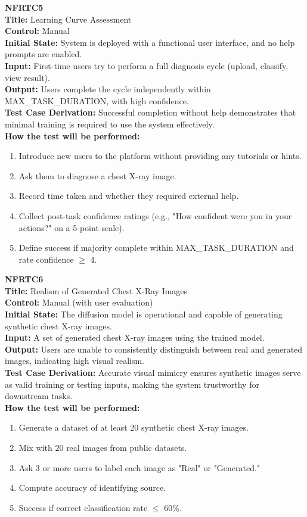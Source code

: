 \documentclass[12pt, titlepage]{article}
\begin{document}
\textbf{NFRTC5}\\
\textbf{Title:} Learning Curve Assessment\\
\textbf{Control:} Manual\\
\textbf{Initial State:} System is deployed with a functional user interface, and no help prompts are enabled.\\
\textbf{Input:} First-time users try to perform a full diagnosis cycle (upload, classify, view result).\\
\textbf{Output:} Users complete the cycle independently within MAX\_TASK\_DURATION, with high confidence.\\
\textbf{Test Case Derivation:} Successful completion without help demonstrates that minimal training is required to use the system effectively.\\
\textbf{How the test will be performed:}
\begin{enumerate}
  \item Introduce new users to the platform without providing any tutorials or hints.
  \item Ask them to diagnose a chest X-ray image.
  \item Record time taken and whether they required external help.
  \item Collect post-task confidence ratings (e.g., "How confident were you in your actions?" on a 5-point scale).
  \item Define success if majority complete within MAX\_TASK\_DURATION and rate confidence $\geq$ 4.
\end{enumerate}

\vspace{1em}

\textbf{NFRTC6}\\
\textbf{Title:} Realism of Generated Chest X-Ray Images\\
\textbf{Control:} Manual (with user evaluation)\\
\textbf{Initial State:} The diffusion model is operational and capable of generating synthetic chest X-ray images.\\
\textbf{Input:} A set of generated chest X-ray images using the trained model.\\
\textbf{Output:} Users are unable to consistently distinguish between real and generated images, indicating high visual realism.\\
\textbf{Test Case Derivation:} Accurate visual mimicry ensures synthetic images serve as valid training or testing inputs, making the system trustworthy for downstream tasks.\\
\textbf{How the test will be performed:}
\begin{enumerate}
  \item Generate a dataset of at least 20 synthetic chest X-ray images.
  \item Mix with 20 real images from public datasets.
  \item Ask 3 or more users to label each image as "Real" or "Generated."
  \item Compute accuracy of identifying source.
  \item Success if correct classification rate $\leq$ 60\%.
\end{enumerate}
\end{document}
